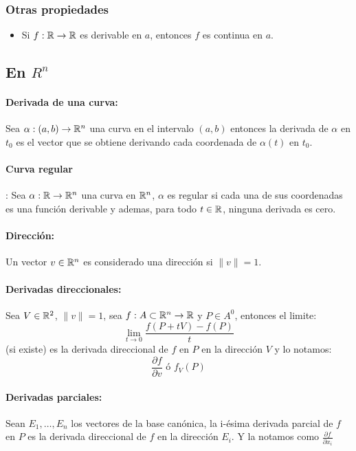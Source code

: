 \subsubsection{Otras propiedades}
\begin{itemize}
\item Si $f:\mathbb{R}\to\mathbb{R}$ es derivable en $a$, entonces $f$ es continua en $a$.
\end{itemize}

\subsection{\texorpdfstring{En $R^n$}{En el espacio}}
\paragraph{Derivada de una curva: } Sea $\alpha:(a,b)\to\mathbb{R}^n$ una curva en el intervalo $(a,b)$ entonces la derivada de $\alpha$ en $t_0$ es el vector que se obtiene derivando cada coordenada de $\alpha(t)$ en $t_0$.

\paragraph{Curva regular}: Sea $\alpha:\mathbb{R}\to\mathbb{R}^n$ una curva en $\mathbb{R}^n$, $\alpha$ es regular si cada una de sus coordenadas es una función derivable y ademas, para todo $t\in\mathbb{R}$, ninguna derivada es cero.

\paragraph{Dirección:} Un vector $v\in\mathbb{R}^n$ es considerado una dirección si $\|v\| = 1$.

\paragraph{Derivadas direccionales: } Sea $V\in\mathbb{R}^2$, $\|v\| = 1$, sea $f:A\subset\mathbb{R}^n\to\mathbb{R}$ y $P\in A^0$, entonces el limite:
$$\lim_{t\to 0}\frac{f(P + tV) - f(P)}{t}$$
(si existe) es la derivada direccional de $f$ en $P$ en la dirección $V$ y lo notamos:
$$\frac{\partial f}{\partial v} \text{ ó } f_V(P)$$

\paragraph{Derivadas parciales: } Sean $E_1,\dots,E_n$ los vectores de la base canónica, la i-ésima derivada parcial de $f$ en $P$ es la derivada direccional de $f$ en la dirección $E_i$. Y la notamos como $\frac{\partial f}{\partial x_i}$

